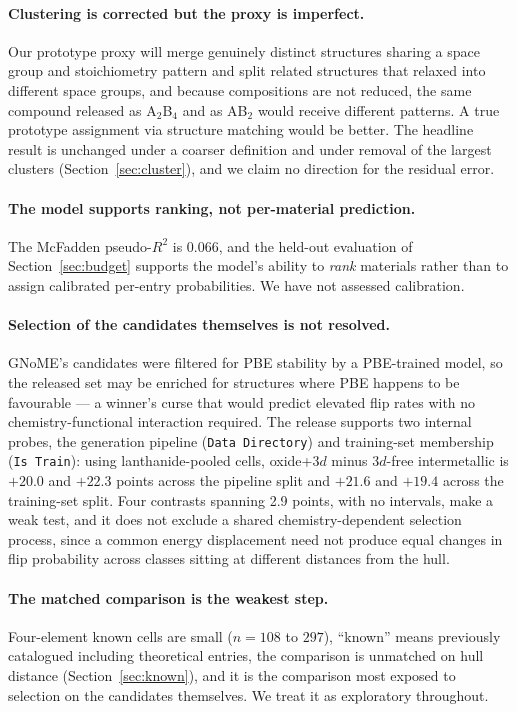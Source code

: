 \documentclass[11pt]{article}
\begin{document}
\paragraph{Clustering is corrected but the proxy is imperfect.} Our prototype proxy
will merge genuinely distinct structures sharing a space group and stoichiometry pattern
and split related structures that relaxed into different space groups, and because
compositions are not reduced, the same compound released as A$_2$B$_4$ and as AB$_2$
would receive different patterns. A true prototype assignment via structure matching
would be better. The headline result is unchanged under a coarser definition and under
removal of the largest clusters (Section~\ref{sec:cluster}), and we claim no direction
for the residual error.

\paragraph{The model supports ranking, not per-material prediction.} The McFadden
pseudo-$R^2$ is 0.066, and the held-out evaluation of Section~\ref{sec:budget} supports
the model's ability to \emph{rank} materials rather than to assign calibrated per-entry
probabilities. We have not assessed calibration.

\paragraph{Selection of the candidates themselves is not resolved.}\label{sec:curse}
GNoME's candidates were filtered for PBE stability by a PBE-trained model, so the
released set may be enriched for structures where PBE happens to be favourable --- a
winner's curse that would predict elevated flip rates with no chemistry-functional
interaction required. The release supports two internal probes, the generation pipeline
(\texttt{Data Directory}) and training-set membership (\texttt{Is Train}): using
lanthanide-pooled cells, oxide+3$d$ minus 3$d$-free intermetallic is $+20.0$ and $+22.3$
points across the pipeline split and $+21.6$ and $+19.4$ across the training-set split.
Four contrasts spanning 2.9 points, with no intervals, make a weak test, and it does not
exclude a shared chemistry-dependent selection process, since a common energy
displacement need not produce equal changes in flip probability across classes sitting
at different distances from the hull.

\paragraph{The matched comparison is the weakest step.} Four-element known cells are
small ($n=108$ to $297$), ``known'' means previously catalogued including theoretical
entries, the comparison is unmatched on hull distance (Section~\ref{sec:known}), and it is
the comparison most exposed to selection on the candidates themselves. We treat it as
exploratory throughout.
\end{document}
